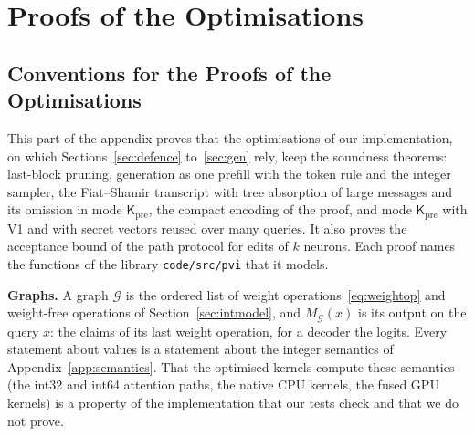 \begingroup\sloppy
\providecommand{\F}{\mathbb{F}_p}
\providecommand{\enc}{\mathrm{Enc}}
\providecommand{\T}{\top}
\providecommand{\sC}{\mathsf{C}}
\providecommand{\sK}{\mathsf{K}}
\providecommand{\Kpre}{\mathsf{K}_{\mathrm{pre}}}
\providecommand{\para}[1]{\par\noindent\textbf{#1}\quad}
\providecommand{\todo}[1]{\textbf{[TODO: #1]}}
\providecommand{\Fext}{\mathbb{K}}
\providecommand{\Vlo}{\mathrm{lo}}
\providecommand{\Vshift}{\mathrm{shift}}
\providecommand{\Vrq}{\mathrm{rq}}
\providecommand{\Vtab}{\mathcal{T}}
\providecommand{\Vcut}{\mathcal{C}}
\providecommand{\Vclr}{\mathcal{O}}
\providecommand{\Nleaf}{N_{\mathrm{leaf}}}
\providecommand{\Veq}{\mathrm{eq}}
\providecommand{\toprule}{\hline}
\providecommand{\midrule}{\hline}
\providecommand{\bottomrule}{\hline}

\section{Proofs of the Optimisations}
\label{app:opt}

\subsection{Conventions for the Proofs of the Optimisations}
\label{app:the-conv}

This part of the appendix proves that the optimisations of our implementation, on which
Sections~\ref{sec:defence} to~\ref{sec:gen} rely, keep the soundness theorems: last-block pruning,
generation as one prefill with the token rule and the integer sampler, the Fiat--Shamir transcript
with tree absorption of large messages and its omission in mode $\Kpre$, the compact encoding of the
proof, and mode $\Kpre$ with V1 and with secret vectors reused over many queries. It also proves the
acceptance bound of the path protocol for edits of $k$ neurons. Each proof names the functions of
the library \texttt{code/src/pvi} that it models.

\para{Graphs.} A graph $\mathcal G$ is the ordered list of weight operations~\eqref{eq:weightop} and
weight-free operations of Section~\ref{sec:intmodel}, and $M_{\mathcal G}(x)$ is its output on
the query $x$: the claims of its last weight operation, for a decoder the logits. Every statement
about values is a statement about the integer semantics of Appendix~\ref{app:semantics}. That the
optimised kernels compute these semantics (the int32 and int64 attention paths, the native CPU
kernels, the fused GPU kernels) is a property of the implementation that our tests check and that
we do not prove.

